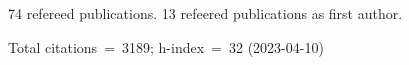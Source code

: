 74 refereed publications. 13 refeered publications as first author.

Total citations~=~3189; h-index~=~32 (2023-04-10)